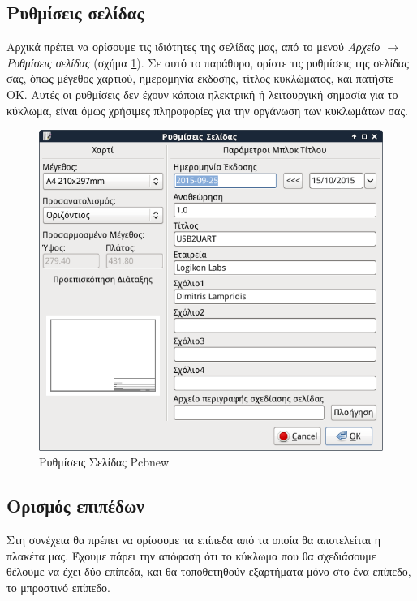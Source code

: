 \documentclass[a4paper]{article}
\begin{document}
\subsection{Ρυθμίσεις σελίδας}
Αρχικά πρέπει να ορίσουμε τις ιδιότητες της σελίδας μας, από το μενού \textit{Αρχείο $\rightarrow$ Ρυθμίσεις σελίδας} (σχήμα \ref{fig:pcb-dial-pageset}). Σε αυτό το παράθυρο, ορίστε τις ρυθμίσεις της σελίδας σας, όπως μέγεθος χαρτιού, ημερομηνία έκδοσης, τίτλος κυκλώματος, και πατήστε ΟΚ. Αυτές οι ρυθμίσεις δεν έχουν κάποια ηλεκτρική ή λειτουργική σημασία για το κύκλωμα, είναι όμως χρήσιμες πληροφορίες για την οργάνωση των κυκλωμάτων σας.

\begin{figure}
  \begin{center}
    \includegraphics[width=.5\textwidth]{img/pcb-dial-pageset.png}
    \caption{Ρυθμίσεις Σελίδας Pcbnew}
    \label{fig:pcb-dial-pageset}
  \end{center}
\end{figure}

\subsection{Ορισμός επιπέδων}
Στη συνέχεια θα πρέπει να ορίσουμε τα επίπεδα από τα οποία θα αποτελείται η πλακέτα μας. Έχουμε πάρει την απόφαση ότι το κύκλωμα που θα σχεδιάσουμε θέλουμε να έχει δύο επίπεδα, και θα τοποθετηθούν εξαρτήματα μόνο στο ένα επίπεδο, το μπροστινό επίπεδο. 
\end{document}
